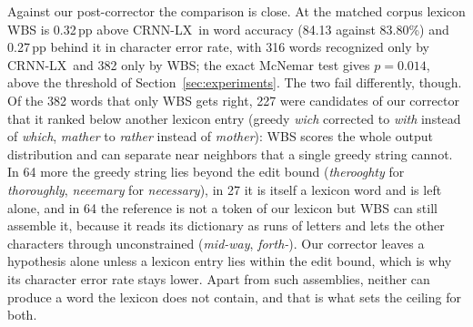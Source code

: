 \documentclass{ws-ijprai}
\newcommand{\ours}{CRNN-LX}            %
\newcommand{\ourwa}{83.80\%}
\begin{document}
Against our post-corrector the comparison is close. At the matched corpus
lexicon WBS is 0.32\,pp above \ours\ in
word accuracy (84.13 against \ourwa) and
0.27\,pp behind it in character error
rate, with 316 words recognized only by \ours\ and
382 only by WBS; the exact McNemar test gives
$p=0.014$, above the threshold of
Section~\ref{sec:experiments}. The two fail differently, though. Of the 382
words that only WBS gets right, 227 were candidates of our corrector that it
ranked below another lexicon entry (greedy \emph{wich} corrected to
\emph{with} instead of \emph{which}, \emph{mather} to \emph{rather} instead
of \emph{mother}): WBS scores the whole output distribution and can separate
near neighbors that a single greedy string cannot. In 64 more the greedy
string lies beyond the edit bound (\emph{therooghty} for \emph{thoroughly},
\emph{neeemary} for \emph{necessary}), in 27 it is itself a lexicon word and
is left alone, and in 64 the reference is not a token of our lexicon but WBS
can still assemble it, because it reads its dictionary as runs of letters and
lets the other characters through unconstrained (\emph{mid-way},
\emph{forth-}). Our corrector leaves a hypothesis alone unless a lexicon entry
lies within the edit bound, which is why its character error rate stays lower.
Apart from such assemblies, neither can produce a word the lexicon does not
contain, and that is what sets the ceiling for both.
\end{document}

